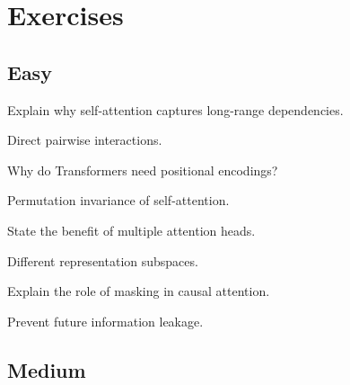 
\section*{Exercises}

\subsection*{Easy}

\begin{exercisebox}[easy]
\begin{problem}
Explain why self-attention captures long-range dependencies.
\end{problem}
\begin{hintbox}
Direct pairwise interactions.
\end{hintbox}
\end{exercisebox}


\begin{exercisebox}[easy]
\begin{problem}
Why do Transformers need positional encodings?
\end{problem}
\begin{hintbox}
Permutation invariance of self-attention.
\end{hintbox}
\end{exercisebox}


\begin{exercisebox}[easy]
\begin{problem}
State the benefit of multiple attention heads.
\end{problem}
\begin{hintbox}
Different representation subspaces.
\end{hintbox}
\end{exercisebox}


\begin{exercisebox}[easy]
\begin{problem}
Explain the role of masking in causal attention.
\end{problem}
\begin{hintbox}
Prevent future information leakage.
\end{hintbox}
\end{exercisebox}


\subsection*{Medium}

